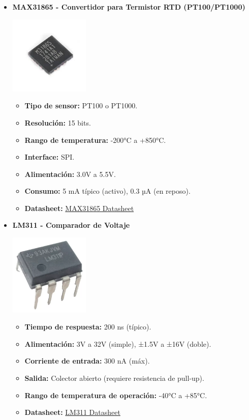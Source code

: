 \begin{itemize}
    \item \textbf{MAX31865 - Convertidor para Termistor RTD (PT100/PT1000)} 
    \begin{center}
        \includegraphics[width=0.3\textwidth]{Imagenes/MAX31685 component.jpg}
    \end{center}
    \begin{itemize}
        \item \textbf{Tipo de sensor:} PT100 o PT1000.
        \item \textbf{Resolución:} 15 bits.
        \item \textbf{Rango de temperatura:} -200°C a +850°C.
        \item \textbf{Interface:} SPI.
        \item \textbf{Alimentación:} 3.0V a 5.5V.
        \item \textbf{Consumo:} 5 mA típico (activo), 0.3 µA (en reposo).
        \item \textbf{Datasheet:} \href{https://datasheets.maximintegrated.com/en/ds/MAX31865.pdf}{MAX31865 Datasheet}
    \end{itemize}

    \item \textbf{LM311 - Comparador de Voltaje} 
    \begin{center}
        \includegraphics[width=0.3\textwidth]{Imagenes/LM311 Component.png}
    \end{center}
    \begin{itemize}
        \item \textbf{Tiempo de respuesta:} 200 ns (típico).
        \item \textbf{Alimentación:} 3V a 32V (simple), ±1.5V a ±16V (doble).
        \item \textbf{Corriente de entrada:} 300 nA (máx).
        \item \textbf{Salida:} Colector abierto (requiere resistencia de pull-up).
        \item \textbf{Rango de temperatura de operación:} -40°C a +85°C.
        \item \textbf{Datasheet:} \href{https://www.ti.com/lit/ds/symlink/lm311.pdf}{LM311 Datasheet}
    \end{itemize}


\end{itemize}
